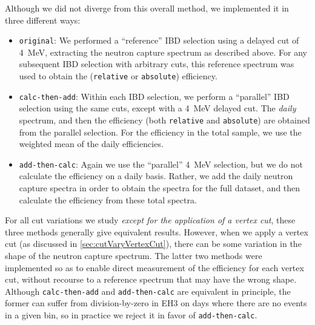 \documentclass[../thesis.tex]{subfiles}
\begin{document}
Although we did not diverge from this overall method, we implemented it in three different ways:

\begin{itemize}
\item \texttt{original}: We performed a ``reference'' IBD selection using a delayed cut of 4~MeV, extracting the neutron capture spectrum as described above. For any subsequent IBD selection with arbitrary cuts, this reference spectrum was used to obtain the (\texttt{relative} or \texttt{absolute}) efficiency.
\item \texttt{calc-then-add}: Within each IBD selection, we perform a ``parallel'' IBD selection using the same cuts, except with a 4~MeV delayed cut. The \emph{daily} spectrum, and then the efficiency (both \texttt{relative} and \texttt{absolute}) are obtained from the parallel selection. For the efficiency in the total sample, we use the weighted mean of the daily efficiencies.
\item \texttt{add-then-calc}: Again we use the ``parallel'' 4~MeV selection, but we do not calculate the efficiency on a daily basis. Rather, we add the daily neutron capture spectra in order to obtain the spectra for the full dataset, and then calculate the efficiency from these total spectra.
\end{itemize}

For all cut variations we study \emph{except for the application of a vertex cut}, these three methods generally give equivalent results. However, when we apply a vertex cut (as discussed in \autoref{sec:cutVaryVertexCut}), there can be some variation in the shape of the neutron capture spectrum. The latter two methods were implemented so as to enable direct measurement of the efficiency for each vertex cut, without recourse to a reference spectrum that may have the wrong shape. Although \texttt{calc-then-add} and \texttt{add-then-calc} are equivalent in principle, the former can suffer from division-by-zero in EH3 on days where there are no events in a given bin, so in practice we reject it in favor of \texttt{add-then-calc}.

\begin{comment}
In most of the results that follow, we show the outcome of using the \texttt{original} method, but the other methods give the same results. When we later discuss the application of vertex cuts, we will switch to the \texttt{add-then-calc} method (and will show the difficulties that result when attempting to use the \texttt{original} method).
\end{comment}
\end{document}

